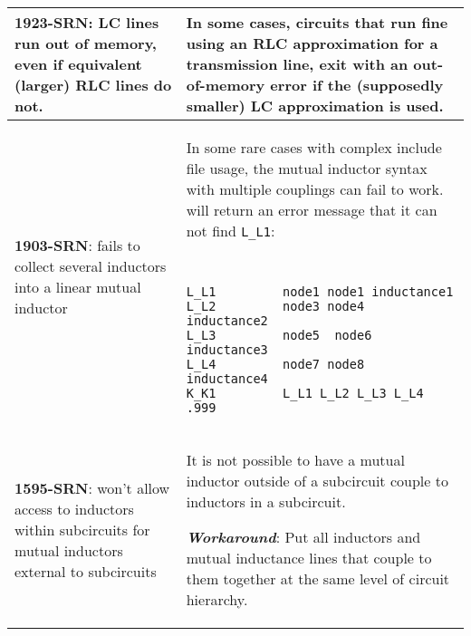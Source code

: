 {\begin{longtable}[h] {>{\raggedright\small}m{2in}|>{\raggedright\let\\\tabularnewline\small}m{3.5in}}
\textbf{1923-SRN}: LC lines run out of memory, even if equivalent (larger) RLC
lines do not. &  In some cases, circuits that run fine using an RLC approximation for a
transmission line, exit with an out-of-memory error if the (supposedly smaller) LC
approximation is used.
\\ \hline

\textbf{1903-SRN}: \Xyce{} fails to collect several inductors into a linear mutual inductor &
In some rare cases with complex include file usage, the mutual inductor syntax with multiple couplings can fail to work. \Xyce{} will return an error message that it can not find 
\texttt{L\_L1}:
{\tt
\begin{verbatim}
L_L1         node1 node1 inductance1
L_L2         node3 node4  inductance2
L_L3         node5  node6  inductance3
L_L4         node7 node8  inductance4
K_K1         L_L1 L_L2 L_L3 L_L4   .999 
\end{verbatim}
}

\\ \hline

\textbf{1595-SRN}: \Xyce{} won't allow access to inductors within subcircuits for
mutual inductors external to subcircuits & It is not possible to have a mutual
inductor outside of a subcircuit couple to inductors in a subcircuit.

\textbf{\textit{Workaround}}: Put all inductors and mutual inductance lines that couple to
them together at the same level of circuit hierarchy.
\\ \hline

\end{longtable}
}
